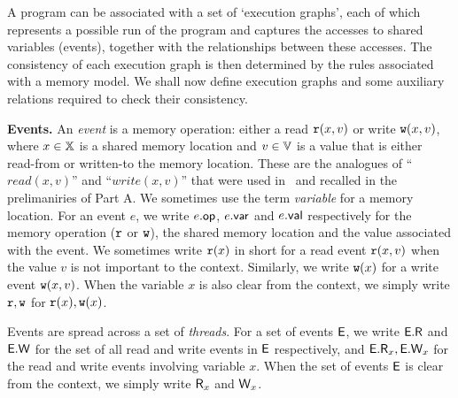 \label{sec:prelims}

\newcommand{\vm}{\mathrm{V}\MemModel}

A program can be associated with a set of `execution graphs'\cite{lahavveri}, each of which represents a possible run of the program and captures the accesses to shared variables (events), together with the relationships between these accesses. The consistency of each  execution graph is then determined by the rules associated with a memory model.
We shall now define execution graphs and some auxiliary  relations required to check their consistency.



\noindent \textbf{Events.} An \emph{event} is a memory operation: either a read $\mathtt{r}(x, v)$ or write $\mathtt{w}(x, v)$, where $x \in {\mathbb X}$ is a shared memory location  and $v \in {\mathbb V}$ is a value that is either read-from or written-to the memory location. These are the analogues of ``$read(x,v)$'' and ``$write(x,v)$'' that were used in~\cite{gibbons} and recalled in the prelimaniries of Part A. We sometimes use the term \emph{variable} for a memory location. For an event $e$, we write $e.\mathsf{op}$, $e.\mathsf{var}$ and $e.\mathsf{val}$ respectively for the memory operation ($\mathtt{r}$ or $\mathtt{w}$), the shared memory location and the value associated with the event. We sometimes write $\mathtt{r}(x)$ in short for a read event $\mathtt{r}(x, v)$ when the value $v$ is not important to the context. Similarly, we write $\mathtt{w}(x)$ for a write event $\mathtt{w}(x, v)$. When the variable $x$ is also clear from the context, we simply write $\mathtt{r}, \mathtt{w}$ for $\mathtt{r}(x), \mathtt{w}(x)$.

Events are spread across a set of \emph{threads}.
For a set of events $\mathsf{E}$, we write $\mathsf{E}.\mathsf{R}$ and $\mathsf{E}.\mathsf{W}$ for the set of all read and write events in $\mathsf{E}$ respectively, and $\mathsf{E}.\mathsf{R}_x, \mathsf{E}.\mathsf{W}_x$ for the read and write events involving variable $x$. When the set of events $\mathsf{E}$ is clear from the context, we simply write $\mathsf{R}_x$ and $\mathsf{W}_x$. 

